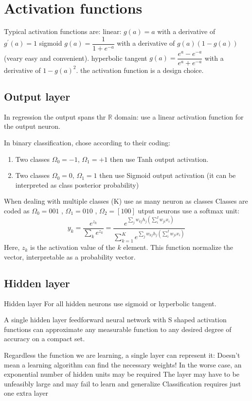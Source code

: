 \section{Activation functions}

Typical activation functions are: 
linear: $g(a)=a$ with a derivative of $g^\prime (a)=1$
sigmoid $g(a)=\dfrac{1}{1+e^{-a}}$ with a derivative of $g(a)(1-g(a))$ (veary easy and convenient). 
hyperbolic tangent $g(a)=\dfrac{e^a-e^{-a}}{e^a+e^{-a}}$ with a derivative of $1-g(a)^2$.
the activation function is a design choice. 


\subsection{Output layer}
In regression the output spans thr $\mathbb{R}$ domain: use a linear activation function for the output neuron.

In binary classification, chose according to their coding:
\begin{enumerate}
    \item Two classes $\Omega_0 = -1$, $\Omega_1 = +1$ then use Tanh output activation.
    \item Two classes $\Omega_0 = 0$, $\Omega_1 = 1$ then use Sigmoid output activation (it can be interpreted as class posterior probability)
\end{enumerate}
When dealing with multiple classes (K) use as many neuron as classes
Classes are coded as $\Omega_0 = 0 0 1$ , $\Omega_1 = 0 1 0$ , $\Omega_2 = [1 0 0]$
utput neurons use a softmax unit: 
\[y_k=\dfrac{e^{z_k}}{\sum_ke^{z_k}}=\dfrac{e^{\sum_jw_{kj}h_j(\sum_i^Iw_{ji}x_i)}}{\sum_{k=1}^Ke^{\sum_jw_{kj}h_j(\sum_i^Iw_{ji}x_i)}}\]
Here, $z_k$ is the activation value of the $k$ element.
This function normalize the vector, interpretable as a probability vector.

\subsection{Hidden layer}
Hidden layer 
For all hidden neurons use sigmoid or hyperbolic tangent.
\begin{theorem}
    A single hidden layer feedforward neural network with S shaped activation functions can approximate any measurable function to any desired degree of accuracy on a compact set.
\end{theorem}
Regardless the function we are learning, a single layer can represent it:
Doesn't mean a learning algorithm can find the necessary weights!
In the worse case, an exponential number of hidden units may be required
The layer may have to be unfeasibly large and may fail to learn and generalize
Classification requires just one extra layer








